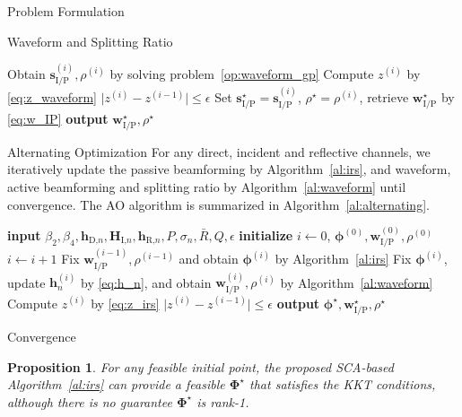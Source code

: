 \documentclass[journal]{IEEEtran}
\newtheorem{proposition}{Proposition}
\begin{document}
\begin{section}{Problem Formulation}
\begin{subsection}{Waveform and Splitting Ratio}
\begin{algorithm}[!t]
\begin{algorithmic}[1]
						\State Obtain $\boldsymbol{s}_{\text{I/P}}^{(i)},\rho^{(i)}$ by solving problem~\eqref{op:waveform_gp}
						\State Compute $z^{(i)}$ by \eqref{eq:z_waveform}
					\Until $\lvert z^{(i)} - z^{(i-1)} \rvert \le \epsilon$
					\State Set $\boldsymbol{s}_{\text{I/P}}^{\star}=\boldsymbol{s}_{\text{I/P}}^{(i)}$, $\rho^{\star}=\rho^{(i)}$, retrieve $\boldsymbol{w}_{\text{I/P}}^{\star}$ by \eqref{eq:w_IP}
					\State \textbf{output} $\boldsymbol{w}_{\text{I/P}}^{\star}, \rho^{\star}$
				\end{algorithmic}
			\end{algorithm}
		\end{subsection}


		\begin{subsection}{Alternating Optimization}
			For any direct, incident and reflective channels, we iteratively update the passive beamforming by Algorithm~\ref{al:irs}, and waveform, active beamforming and splitting ratio by Algorithm~\ref{al:waveform} until convergence. The AO algorithm is summarized in Algorithm~\ref{al:alternating}.
			\begin{algorithm}[!t]
				\caption{AO: Waveform, Active and Passive Beamforming.}
				\label{al:alternating}
				\begin{algorithmic}[1]
					\State \textbf{input} $\beta_2,\beta_4,\boldsymbol{h}_{\text{D,}n},\boldsymbol{H}_{\text{I,}n},\boldsymbol{h}_{\text{R,}n},P,\sigma_n,\bar{R},Q,\epsilon$
					\State \textbf{initialize} $i \gets 0$, $\boldsymbol{\phi}^{(0)},\boldsymbol{w}_{\text{I/P}}^{(0)},\rho^{(0)}$
					\Repeat
						\State $i \gets i + 1$
						\State Fix $\boldsymbol{w}_{\text{I/P}}^{(i-1)},\rho^{(i-1)}$ and obtain $\boldsymbol{\phi}^{(i)}$ by Algorithm~\ref{al:irs}
						\State Fix $\boldsymbol{\phi}^{(i)}$, update $\boldsymbol{h}_n^{(i)}$ by \eqref{eq:h_n}, and obtain $\boldsymbol{w}_{\text{I/P}}^{(i)}, \rho^{(i)}$ by Algorithm~\ref{al:waveform}
						\State Compute $z^{(i)}$ by \eqref{eq:z_irs}
					\Until $\lvert z^{(i)} - z^{(i-1)} \rvert \le \epsilon$
					\State \textbf{output} $\boldsymbol{\phi}^{\star}, \boldsymbol{w}_{\text{I/P}}^{\star}, \rho^{\star}$
				\end{algorithmic}
			\end{algorithm}
		\end{subsection}


		\begin{subsection}{Convergence}
			\begin{proposition}\label{pr:irs}
				For any feasible initial point, the proposed SCA-based Algorithm~\ref{al:irs} can provide a feasible $\boldsymbol{\Phi}^{\star}$ that satisfies the KKT conditions, although there is no guarantee $\boldsymbol{\Phi}^{\star}$ is rank-\num{1}.
			\end{proposition}


\end{subsection}
\end{section}
\end{document}
